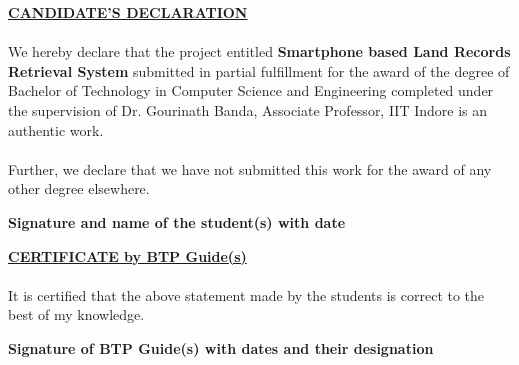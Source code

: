 \documentclass[12pt]{article}
\begin{document}

{
    \begin{center}
        \textbf{\underline{\large{CANDIDATE’S DECLARATION}}}
    \end{center}

    \paragraph{}
    We hereby declare that the project entitled \textbf{Smartphone based Land Records Retrieval System} submitted in partial fulfillment for the award of the degree of Bachelor of Technology in Computer Science and Engineering completed under the supervision of Dr. Gourinath Banda, Associate Professor, IIT Indore is an authentic work.

    \paragraph{}
    Further, we declare that we have not submitted this work for the award of any other degree elsewhere.

    \vspace{4cm}
    \begin{flushright}
        \textbf{Signature and name of the student(s) with date}
    \end{flushright}
    \vspace{1cm}

    \begin{center}
        \textbf{\underline{\large{CERTIFICATE by BTP Guide(s)}}}
    \end{center}

    \paragraph{}
    It is certified that the above statement made by the students is correct to the best of my knowledge.

    \vspace{3cm}
    \begin{flushright}
        \textbf{Signature of BTP Guide(s) with dates and their designation}
    \end{flushright}

    \thispagestyle{empty}
}
\clearpage

\end{document}
